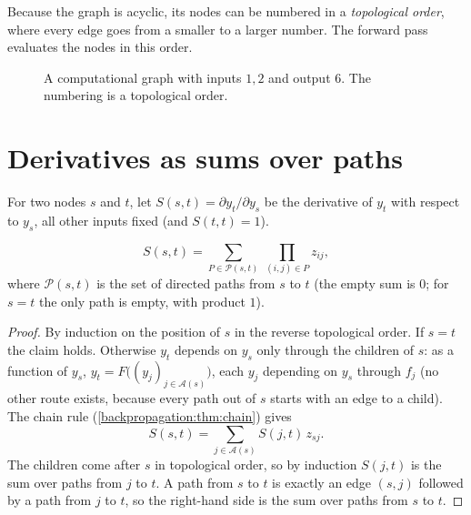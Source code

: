 \begin{notechapter}
Because the graph is acyclic, its nodes can be numbered in a \emph{topological order}, where
every edge goes from a smaller to a larger number. The forward pass evaluates the nodes in
this order.

\begin{figure}[ht]
\centering
{}
\caption{A computational graph with inputs $1,2$ and output $6$. The numbering is a
topological order.}
\label{computational-graphs:fig:six}
\end{figure}

\section{Derivatives as sums over paths}\label{computational-graphs:sec:paths}

For two nodes $s$ and $t$, let $S(s,t) = \partial y_t/\partial y_s$ be the derivative of $y_t$ with respect to $y_s$, all
other inputs fixed (and $S(t,t) = 1$).

\begin{lemma}\label{computational-graphs:lem:paths}
\[
  S(s,t) = \sum_{P\in\mathcal P(s,t)}\ \prod_{(i,j)\in P}z_{ij},
\]
where $\mathcal P(s,t)$ is the set of directed paths from $s$ to $t$ (the empty sum is $0$; for $s = t$ the only path
is empty, with product $1$).
\end{lemma}

\begin{proof}
By induction on the position of $s$ in the reverse topological order. If $s = t$ the claim
holds. Otherwise $y_t$ depends on $y_s$ only through the children of $s$: as a function of $y_s$,
$y_t = F\bigl((y_j)_{j\in\mathcal A(s)}\bigr)$, each $y_j$ depending on $y_s$ through $f_j$ (no other route exists, because every
path out of $s$ starts with an edge to a child). The chain rule
(\cref{backpropagation:thm:chain}) gives
\[
  S(s,t) = \sum_{j\in\mathcal A(s)}S(j,t)\,z_{sj} .
\]
The children come after $s$ in topological order, so by induction $S(j,t)$ is the sum over paths
from $j$ to $t$. A path from $s$ to $t$ is exactly an edge $(s,j)$ followed by a path from $j$ to $t$, so the
right-hand side is the sum over paths from $s$ to $t$.
\end{proof}


\end{notechapter}
